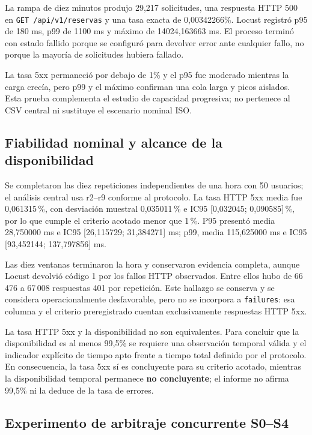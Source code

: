 La rampa de diez minutos produjo 29,217 solicitudes, una respuesta HTTP 500 en
\texttt{GET /api/v1/reservas} y una tasa exacta de 0,00342266\%. Locust registró
p95 de 180 ms, p99 de 1100 ms y máximo de 14024,163663 ms. El proceso terminó
con estado fallido porque se configuró para devolver error ante cualquier fallo,
no porque la mayoría de solicitudes hubiera fallado.

La tasa 5xx permaneció por debajo de 1\% y el p95 fue moderado mientras la carga
crecía, pero p99 y el máximo confirman una cola larga y picos aislados. Esta
prueba complementa el estudio de capacidad progresiva; no pertenece al CSV
central ni sustituye el escenario nominal ISO.

\subsection{Fiabilidad nominal y alcance de la disponibilidad}
\label{subsec:fiabilidad-disponibilidad}

Se completaron las diez repeticiones independientes de una hora con 50 usuarios;
el análisis central usa r2--r9 conforme al protocolo. La tasa HTTP 5xx media fue
0,061315\,\%, con desviación muestral 0,035011\,\% e IC95
[0,032045; 0,090585]\,\%, por lo que cumple el criterio acotado menor que
1\,\%. P95 presentó media 28,750000 ms e IC95 [26,115729; 31,384271] ms;
p99, media 115,625000 ms e IC95 [93,452144; 137,797856] ms.

Las diez ventanas terminaron la hora y conservaron evidencia completa, aunque
Locust devolvió código 1 por los fallos HTTP observados. Entre ellos hubo de
66\,476 a 67\,008 respuestas 401 por repetición. Este hallazgo se conserva y
se considera operacionalmente desfavorable, pero no se incorpora a
\texttt{failures}: esa columna y el criterio preregistrado cuentan
exclusivamente respuestas HTTP 5xx.

La tasa HTTP 5xx y la disponibilidad no son equivalentes. Para concluir que la
disponibilidad es al menos 99,5\% se requiere una observación temporal válida y el
indicador explícito de tiempo apto frente a tiempo total definido por el
protocolo. En consecuencia, la tasa 5xx sí es concluyente para su criterio
acotado, mientras la disponibilidad temporal permanece \textbf{no concluyente};
el informe no afirma 99,5\% ni la deduce de la tasa de errores.

\subsection{Experimento de arbitraje concurrente S0--S4}
\label{subsec:arbiter-resultados}

